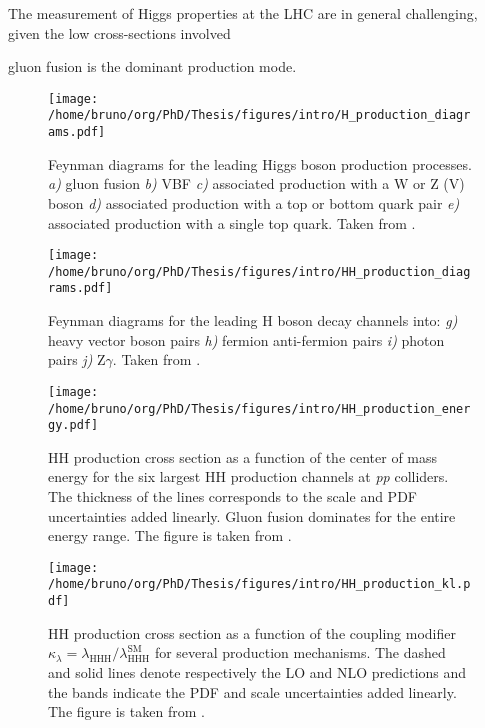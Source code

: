 \documentclass[11pt]{article}
\newcommand{\klrat}{\kappa_{\lambda} = \lambda_{\text{HHH}} / \lambda_{\text{HHH}}^{\text{SM}}}
\begin{document}
The measurement of Higgs properties at the LHC are in general challenging, given the low cross-sections involved

gluon fusion is the dominant production mode.

\begin{figure}[htbp]
\centering
\texttt{[image: /home/bruno/org/PhD/Thesis/figures/intro/H\_production\_diagrams.pdf]}
\caption{\label{fig:H_production_diagrams}Feynman diagrams for the leading Higgs boson production processes. \emph{a)} gluon fusion \emph{b)} \ac{VBF} \emph{c)} associated production with a W or Z (V) boson \emph{d)} associated production with a top or bottom quark pair \emph{e)} associated production with a single top quark. Taken from \cite{higgs_10_years}.}
\end{figure}

\begin{figure}[htbp]
\centering
\texttt{[image: /home/bruno/org/PhD/Thesis/figures/intro/HH\_production\_diagrams.pdf]}
\caption{\label{fig:HH_production_diagrams_b}Feynman diagrams for the leading H boson decay channels into: \emph{g)} heavy vector boson pairs \emph{h)} fermion anti-fermion pairs \emph{i)} photon pairs \emph{j)} Z\(\gamma\). Taken from \cite{higgs_10_years}.}
\end{figure}

\begin{figure}[htbp]
\centering
\texttt{[image: /home/bruno/org/PhD/Thesis/figures/intro/HH\_production\_energy.pdf]}
\caption{\label{fig:HH_prod_energy}HH production cross section as a function of the center of mass energy for the six largest HH production channels at \emph{pp} colliders. The thickness of the lines corresponds to the scale and PDF uncertainties added linearly. Gluon fusion dominates for the entire energy range. The figure is taken from \cite{HH_xsec_running}.}
\end{figure}

\begin{figure}[htbp]
\centering
\texttt{[image: /home/bruno/org/PhD/Thesis/figures/intro/HH\_production\_kl.pdf]}
\caption{\label{fig:HH_prod_kl}HH production cross section as a function of the coupling modifier \(\klrat\) for several production mechanisms. The dashed and solid lines denote respectively the LO and NLO predictions and the bands indicate the PDF and scale uncertainties added linearly. The figure is taken from \cite{HH_xsec_running}.}
\end{figure}
\end{document}
